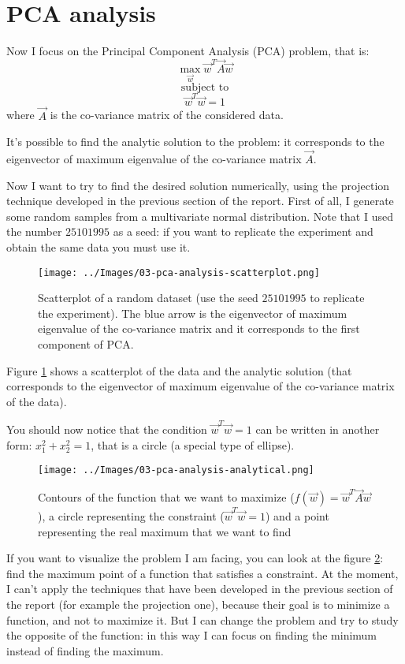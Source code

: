 \section{PCA analysis}
    Now I focus on the Principal Component Analysis (PCA) problem, that is:
    \[\max_{\vec{w}} \vec{w}^T\vec{A}\vec{w}\]
    \[\text{subject to}\]
    \[\vec{w}^T\vec{w} = 1\]
    where \(\vec{A}\) is the co-variance matrix of the considered data.\par
    It's possible to find the analytic solution to the problem: it corresponds to the eigenvector of maximum eigenvalue of the co-variance matrix \(\vec{A}\).\par
    Now I want to try to find the desired solution numerically, using the projection technique developed in the previous section of the report. First of all, I generate some random samples from a multivariate normal distribution. Note that I used the number \(25101995\) as a seed: if you want to replicate the experiment and obtain the same data you must use it.
    \begin{figure}
        \centering
        \texttt{[image: ../Images/03-pca-analysis-scatterplot.png]}
        \caption{Scatterplot of a random dataset (use the seed \(25101995\) to replicate the experiment). The blue arrow is the eigenvector of maximum eigenvalue of the co-variance matrix and it corresponds to the first component of PCA.}
        \label{pca-analysis-scatterplot}
    \end{figure}
    Figure \ref{pca-analysis-scatterplot} shows a scatterplot of the data and the analytic solution (that corresponds to the eigenvector of maximum eigenvalue of the co-variance matrix of the data).\par
    You should now notice that the condition \(\vec{w}^T\vec{w} = 1\) can be written in another form: \(x_1^2+x_2^2=1\), that is a circle (a special type of ellipse).
    \begin{figure}
        \centering
        \texttt{[image: ../Images/03-pca-analysis-analytical.png]}
        \caption{Contours of the function that we want to maximize (\(f(\vec{w}) = \vec{w}^T\vec{A}\vec{w}\)), a circle representing the constraint (\(\vec{w}^T\vec{w} = 1\)) and a point representing the real maximum that we want to find}
        \label{pca-analysis-analytical}
    \end{figure}
    If you want to visualize the problem I am facing, you can look at the figure \ref{pca-analysis-analytical}: find the maximum point of a function that satisfies a constraint. At the moment, I can't apply the techniques that have been developed in the previous section of the report (for example the projection one), because their goal is to minimize a function, and not to maximize it. But I can change the problem and try to study the opposite of the function: in this way I can focus on finding the minimum instead of finding the maximum.
